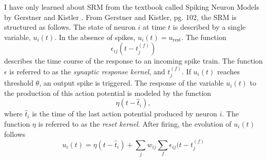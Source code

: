 \documentclass[]{article}
\begin{document}
\begin{multicols}{2}
I have only learned about SRM from the textbook called Spiking Neuron Models by Gerstner and Kistler \cite{geki2002}. From Gerstner and Kistler, pg. 102, the SRM is structured as follows. The state of neuron $i$ at time $t$ is described by a single variable, $u_i(t)$. In the absence of spikes, $u_i(t) = u_{\mathrm{rest}}$. The function
\begin{equation}
\label{eq:synaptic_response_kernel}
\epsilon_{ij}(t-t_j^{(f)})
\end{equation}
describes the time course of the response to an incoming spike train. The function $\epsilon$ is referred to as the \textit{synaptic response kernel}, and $t_j^{(f)}$. If $u_i(t)$ reaches threshold $\theta$, an output spike is triggered. The response of the variable $u_i(t)$ to the production of this action potential is modeled by the function
\begin{equation}
\label{eq:reset_kernel}
\eta(t-\hat{t}_i),
\end{equation}
where $\hat{t}_i$ is the time of the last action potential produced by neuron $i$. The function $\eta$ is referred to as the \textit{reset kernel}. After firing, the evolution of $u_i(t)$ follows
\begin{equation}
\label{eq:spike_response_model}
u_i(t) = \eta(t-\hat{t}_i)+\sum_j w_{ij}\sum_f \epsilon_{ij}(t-t_j^{(f)}
\end{equation}





\end{multicols}
\end{document}
